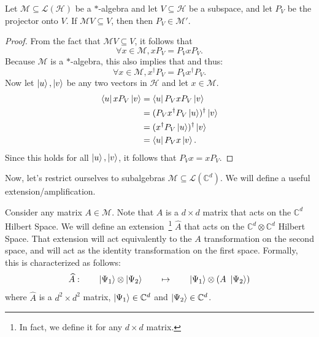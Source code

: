 
\begin{lemma}
\label{ex-2-1-14}
    Let $\mathcal{M} \subseteq \mathcal{L}(\mathcal{H})$ be a $*$-algebra and let $V \subseteq \mathcal{H}$ be a subspace, and let $P_V$ be the projector onto $V$. If $\mathcal{M}V \subseteq V$, then then $P_V \in \mathcal{M}'$.
\end{lemma}
\begin{proof}
    From the fact that $\mathcal{M}V \subseteq V$, it follows that
    \[ \forall x \in \mathcal{M}, x P_V = P_V x P_V.\]
    Because $\mathcal{M}$ is a $*$-algebra, this also implies that  and thus:
    \[ \forall x \in \mathcal{M}, x^\dagger P_V = P_V x^\dagger P_V.\]
    Now let $\ket{u}, \ket{v}$ be any two vectors in $\mathcal{H}$ and let $x \in \mathcal{M}$.
    \begin{align}
        \bra{u} x P_V \ket{v} &= \bra{u} P_V x P_V \ket{v} \\
        &= (P_V x^\dagger P_V \ket{u} )^\dagger \ket{v} \\
        &= (x^\dagger P_V \ket{u})^\dagger \ket{v} \\
        &= \bra{u} P_V x \ket{v}.
    \end{align}
    Since this holds for all $\ket{u}, \ket{v}$, it follows that $P_V x = xP_V$.
\end{proof}

Now, let's restrict ourselves to subalgebras $\mathcal{M} \subseteq \mathcal{L}(\mathbb{C}^d)$. We will define a useful extension/amplification.

Consider any matrix $A \in \mathcal{M}$. Note that $A$ is a $d \times d$ matrix that acts on the $\mathbb{C}^d$ Hilbert Space. We will define an extension~\footnote{In fact, we define it for any $d \times d$ matrix.} $\widehat{A}$ that acts on the $\mathbb{C}^d \otimes \mathbb{C}^d$ Hilbert Space. That extension will act equivalently to the $A$ transformation on the second space, and will act as the identity transformation on the first space. Formally, this is characterized as follows:
    \begin{equation}
        \widehat{A}: \quad\quad\ket{\Psi_1} \otimes \ket{\Psi_2} \quad\quad \mapsto  \quad\quad \ket{\Psi_1} \otimes \left(A \ \ket{\Psi_2}\right)
    \end{equation}
where $\widehat{A}$ is a $d^2 \times d^2$ matrix, $\ket{\Psi_1} \in \mathbb{C}^d$ and $\ket{\Psi_2} \in \mathbb{C}^d$.

